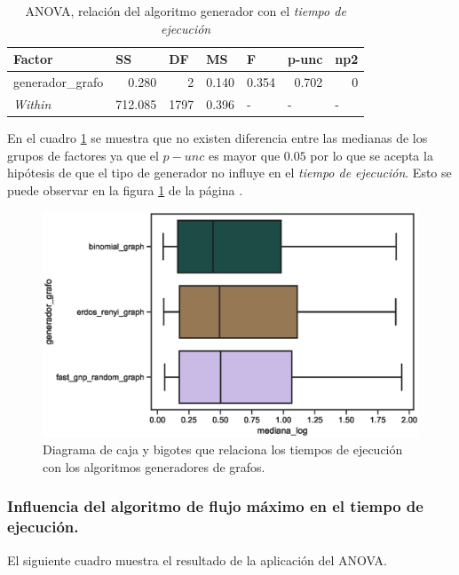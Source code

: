 \documentclass{article}
\begin{document}
\begin{table}[htbp]
  \centering
  \caption{ANOVA, relación del algoritmo generador con el \textit{tiempo de ejecución}}
    \begin{tabular}{lrrrlll}
    \toprule
    \textbf{Factor} & \multicolumn{1}{l}{\textbf{SS}} & \multicolumn{1}{l}{\textbf{DF}} & \multicolumn{1}{l}{\textbf{MS}} & \textbf{F} & \textbf{p-unc} & \textbf{np2} \\
    \midrule
    generador\_grafo & 0.280 & 2     & 0.140 & \multicolumn{1}{r}{0.354} & \multicolumn{1}{r}{0.702} & \multicolumn{1}{r}{0} \\
    \textit{Within} & 712.085 & 1797  & 0.396 & -     & -     & - \\
    \bottomrule
    \end{tabular}%
  \label{tab:t2}%
\end{table}%
En el cuadro \ref{tab:t2} se muestra que no existen diferencia entre las medianas de los grupos de factores ya que el $p-unc$ es mayor que $0.05$ por lo que se acepta la hipótesis de que el tipo de generador no influye en el \textit{tiempo de ejecución}. Esto se puede observar en la figura \ref{fig4} de la página \pageref{fig4}. 


\begin{center}
\begin{figure}[htbp]
\includegraphics[scale=0.6]{boxplotgeneradorgrafo.eps}
\caption{Diagrama de caja y bigotes que relaciona los tiempos de ejecución con los algoritmos generadores de grafos.}
\label{fig4}
\end{figure}
\end{center}
\subsubsection{Influencia del algoritmo de flujo máximo en el tiempo de ejecución.}
El siguiente cuadro muestra el resultado de la aplicación del ANOVA.
\end{document}
